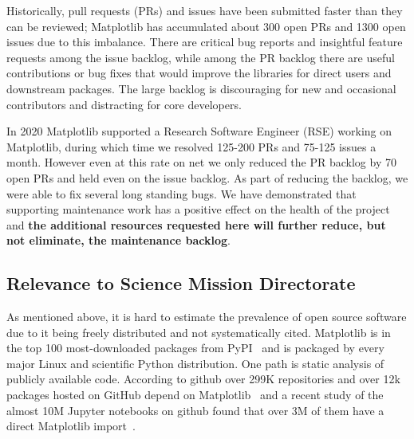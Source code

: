 \documentclass[12pt]{article}
\numberwithin{page}{section}
\begin{document}
Historically, pull requests (PRs) and issues have been submitted
faster than they can be reviewed; Matplotlib has accumulated about 300
open PRs and 1300 open issues due to this imbalance. There are
critical bug reports and insightful feature requests among the issue
backlog, while among the PR backlog there are useful contributions or
bug fixes that would improve the libraries for direct users and
downstream packages.  The large backlog is discouraging for new and
occasional contributors and distracting for core developers.

In 2020 Matplotlib supported a Research Software Engineer (RSE)
working on Matplotlib, during which time we resolved 125-200 PRs and
75-125 issues a month.  However even at this rate on net we only
reduced the PR backlog by 70 open PRs and held even on the issue
backlog.  As part of reducing the backlog, we were able to fix several
long standing bugs.  We have demonstrated that supporting maintenance
work has a positive effect on the health of the project and
\textbf{the additional resources requested here will further reduce,
  but not eliminate, the maintenance backlog}.



\subsection{Relevance to Science Mission Directorate}

As mentioned above, it is hard to estimate the prevalence of open
source software due to it being freely distributed and not
systematically cited.  Matplotlib is in the top 100 most-downloaded
packages from PyPI~\cite{pypi_stats} and is packaged by every major
Linux and scientific Python distribution.  One path is static analysis
of publicly available code.  According to github over 299K
repositories and over 12k packages hosted on GitHub depend on
Matplotlib~\cite{gh_deps:2021} and a recent study of the almost 10M
Jupyter notebooks on github found that over 3M of them have a direct
Matplotlib import~\cite{datalore:2020}.
\end{document}
